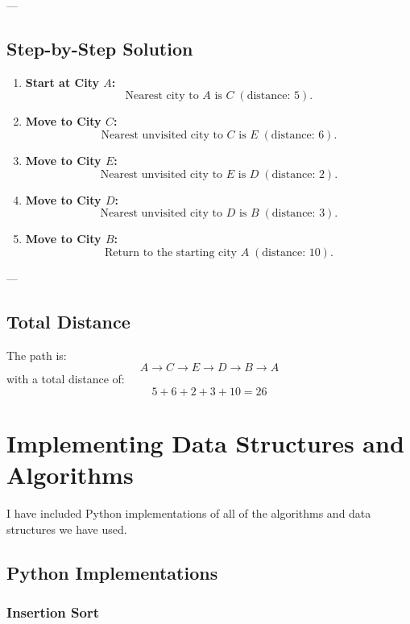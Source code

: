 \documentclass[a4paper,12pt]{article}
\begin{document}
---

\subsection*{Step-by-Step Solution}

\begin{enumerate}
    \item \textbf{Start at City \(A\):}
    \[
    \text{Nearest city to } A \text{ is } C \; (\text{distance: } 5).
    \]
    \item \textbf{Move to City \(C\):}
    \[
    \text{Nearest unvisited city to } C \text{ is } E \; (\text{distance: } 6).
    \]
    \item \textbf{Move to City \(E\):}
    \[
    \text{Nearest unvisited city to } E \text{ is } D \; (\text{distance: } 2).
    \]
    \item \textbf{Move to City \(D\):}
    \[
    \text{Nearest unvisited city to } D \text{ is } B \; (\text{distance: } 3).
    \]
    \item \textbf{Move to City \(B\):}
    \[
    \text{Return to the starting city } A \; (\text{distance: } 10).
    \]
\end{enumerate}

---

\subsection*{Total Distance}

The path is:
\[
A \to C \to E \to D \to B \to A
\]
with a total distance of:
\[
5 + 6 + 2 + 3 + 10 = 26
\]



\newpage

\section{Implementing Data Structures and Algorithms}

I have included Python implementations of all of the algorithms and data structures we have used. 

\subsection{Python Implementations}

\subsubsection{Insertion Sort}
\end{document}
